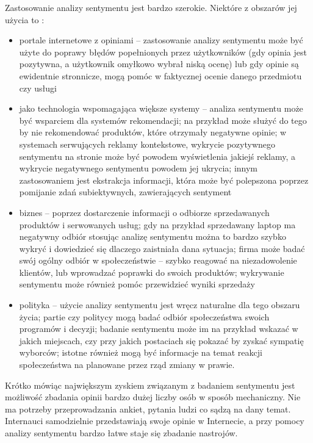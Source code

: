 Zastosowanie analizy sentymentu jest bardzo szerokie. Niektóre
z obszarów jej użycia to \cite{pangLeeApplication}:
\begin{itemize}
  \item portale internetowe z opiniami -- zastosowanie analizy sentymentu
może być użyte do poprawy błędów popełnionych przez użytkowników (gdy opinia
jest pozytywna, a użytkownik omyłkowo wybrał niską ocenę) lub gdy opinie
są ewidentnie stronnicze, mogą pomóc w faktycznej ocenie danego przedmiotu czy 
usługi

\item jako technologia wspomagająca większe systemy -- analiza sentymentu może
być wsparciem dla systemów rekomendacji; na przykład może służyć do 
tego by nie rekomendować produktów, które otrzymały negatywne opinie; 
w systemach serwujących reklamy kontekstowe, wykrycie pozytywnego sentymentu
na stronie może być powodem wyświetlenia jakiejś reklamy,
a wykrycie negatywnego sentymentu powodem jej ukrycia;
innym zastosowaniem jest ekstrakcja informacji, która może być
polepszona poprzez pomijanie zdań subiektywnych, zawierających sentyment

\item biznes -- poprzez dostarczenie informacji o odbiorze sprzedawanych produktów
i serwowanych usług; gdy na przykład sprzedawany laptop ma negatywny odbiór
stosując analizę sentymentu można to bardzo szybko wykryć i dowiedzieć się
dlaczego zaistniała dana sytuacja; firma może badać swój ogólny odbiór
w społeczeństwie -- szybko reagować na niezadowolenie klientów, lub wprowadzać
poprawki do swoich produktów; wykrywanie sentymentu może również pomóc
przewidzieć wyniki sprzedaży

\item polityka -- użycie analizy sentymentu jest wręcz naturalne dla tego obszaru
życia; partie czy politycy mogą badać odbiór społeczeństwa swoich programów
i decyzji; badanie sentymentu może im na przykład wskazać w jakich miejscach,
czy przy jakich postaciach się pokazać by zyskać sympatię wyborców; istotne
również mogą być informacje na temat reakcji społeczeństwa na planowane
przez rząd zmiany w prawie. 
\end{itemize}

Krótko mówiąc największym zyskiem związanym z badaniem sentymentu jest możliwość
zbadania opinii bardzo dużej liczby osób w sposób mechaniczny. Nie ma potrzeby
przeprowadzania ankiet, pytania ludzi co sądzą na dany temat. Internauci samodzielnie
przedstawiają swoje opinie w Internecie, a przy pomocy analizy sentymentu bardzo
łatwe staje się zbadanie nastrojów.



